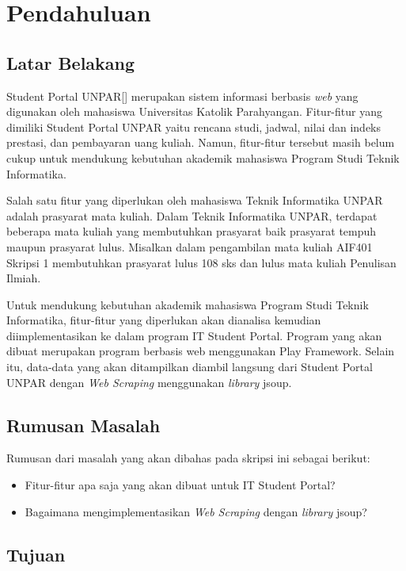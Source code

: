 \chapter{Pendahuluan}
\label{chap:pendahuluan}

\section{Latar Belakang}
\label{sec:latar_belakang}

Student Portal UNPAR[] merupakan sistem informasi berbasis \textit{web} yang digunakan oleh mahasiswa Universitas Katolik Parahyangan. Fitur-fitur yang dimiliki Student Portal UNPAR yaitu rencana studi, jadwal, nilai dan indeks prestasi, dan pembayaran uang kuliah. Namun, fitur-fitur tersebut masih belum cukup untuk mendukung kebutuhan akademik mahasiswa Program Studi Teknik Informatika. 

Salah satu fitur yang diperlukan oleh mahasiswa Teknik Informatika UNPAR adalah prasyarat mata kuliah. Dalam Teknik Informatika UNPAR, terdapat beberapa mata kuliah yang membutuhkan prasyarat baik prasyarat tempuh maupun prasyarat lulus. Misalkan dalam pengambilan mata kuliah AIF401 Skripsi 1 membutuhkan prasyarat lulus 108 sks dan lulus mata kuliah Penulisan Ilmiah. 

Untuk mendukung kebutuhan akademik mahasiswa Program Studi Teknik Informatika, fitur-fitur yang diperlukan akan dianalisa kemudian diimplementasikan ke dalam program IT Student Portal. Program yang akan dibuat merupakan program berbasis web menggunakan Play Framework. Selain itu, data-data yang akan ditampilkan diambil langsung dari Student Portal UNPAR dengan \textit{Web Scraping} menggunakan \textit{library} jsoup.

\section{Rumusan Masalah}
\label{sec:rumusan_masalah}

Rumusan dari masalah yang akan dibahas pada skripsi ini sebagai
berikut:
\begin{itemize}
	\item Fitur-fitur apa saja yang akan dibuat untuk IT Student Portal?
	\item Bagaimana mengimplementasikan \textit{Web Scraping} dengan \textit{library} jsoup?
\end{itemize}

\section{Tujuan}
\label{sec:tujuan}

